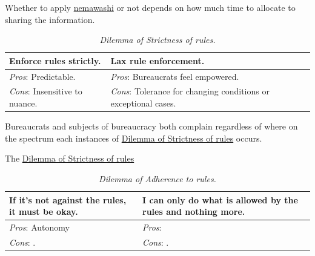 Whether to apply \href{https://en.wikipedia.org/wiki/Nemawashi}{nemawashi} or not depends on how much time to allocate to sharing the information. 

\begin{center}
\begin{table}[H] %
\begin{tabular}{ | m{\dilemmatablewidth}| m{\dilemmatablewidth} | } 
  \hline
  \textbf{Enforce rules strictly.} & 
  \textbf{Lax rule enforcement.} \\ 
  \hline
  \textit{Pros}: Predictable. &
  \textit{Pros}: Bureaucrats feel empowered. \\
  \hline
  \textit{Cons}: Insensitive to nuance. & 
  \textit{Cons}: Tolerance for changing conditions or exceptional cases.  \\  
  \hline
\end{tabular}
\caption{
\textit{Dilemma of Strictness of rules.}
}
\label{table:rule-strictness}
\end{table}
\end{center}

Bureaucrats and subjects of bureaucracy both complain regardless of where on the spectrum each instances of \href{table:rule-strictness}{Dilemma of Strictness of rules} occurs. 

The \href{table:rule-strictness}{Dilemma of Strictness of rules}


\begin{center}
\begin{table}[H] %
\begin{tabular}{ | m{\dilemmatablewidth}| m{\dilemmatablewidth} | } 
  \hline
  \textbf{If it's not against the rules, it must be okay.} & 
  \textbf{I can only do what is allowed by the rules and nothing more.} \\ 
  \hline
  \textit{Pros}: Autonomy &
  \textit{Pros}:  \\
  \hline
  \textit{Cons}: . & 
  \textit{Cons}: .  \\  
  \hline
\end{tabular}
\caption{
\textit{Dilemma of Adherence to rules.}
}
\label{table:rule-adherence}
\end{table}
\end{center}


